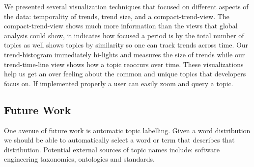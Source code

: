 \documentclass[times, 10pt,twocolumn]{article}
\newcommand{\shrinkit}{\vspace*{-.3em}}
\begin{document}


We presented several visualization techniques that focused on
different aspects of the data: temporality of trends, trend size, and
a compact-trend-view. The compact-trend-view shows much more
information than the views that global analysis could show, it
indicates how focused a period is by the total number of topics as
well shows topics by similarity so one can track trends across time.
Our trend-histogram immediately hi-lights and measures the size of
trends while our trend-time-line view shows how a topic reoccurs over
time. These visualizations help us get an over feeling about the
common and unique topics that developers focus on. If implemented
properly a user can easily zoom and query a topic.


\shrinkit
\subsection{ Future Work}
\shrinkit

One avenue of future work is automatic topic labelling. Given a word
distribution we should be able to automatically select a word or term
that describes that distribution. Potential external sources of topic
names include: software engineering taxonomies, ontologies and
standards.






%


\end{document}

